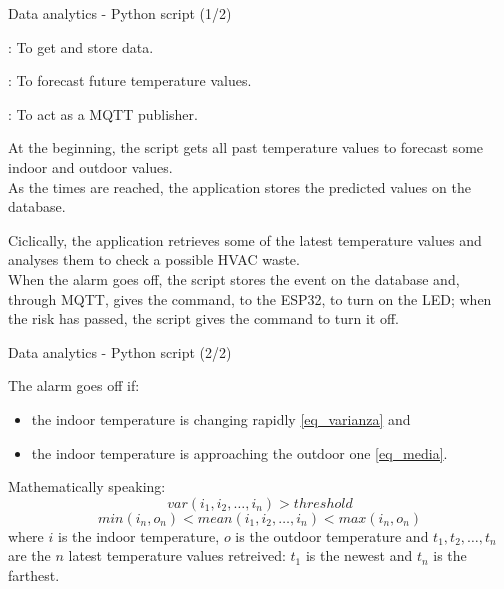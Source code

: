 \documentclass{beamer}
\begin{document}
\begin{frame}{Data analytics -  Python script (1/2)}

	\begin{description}[\texttt{influxdb-client}]		%
		\item[\texttt{influxdb-client}]: To get and store data.
		\item[\texttt{prophet}]: To forecast future temperature values.
		\item[\texttt{paho-mqtt}]: To act as a MQTT publisher.
	\end{description}

	\vfill

	At the beginning, the script gets all past temperature values to forecast some indoor and outdoor values.\\As the times are reached, the application stores the predicted values on the database.
	
	\vfill
	
	Ciclically, the application retrieves some of the latest temperature values and analyses them to check a possible HVAC waste.\\
	When the alarm goes off, the script stores the event on the database and, through MQTT, gives the command, to the ESP32, to turn on the LED; when the risk has passed, the script gives the command to turn it off.

\end{frame}


\begin{frame}{Data analytics -  Python script (2/2)}

	The alarm goes off if:
	\begin{itemize}
		\item the indoor temperature is changing rapidly \eqref{eq_varianza} and
		\item the indoor temperature is approaching the outdoor one \eqref{eq_media}.
	\end{itemize}
	
	\vfill
	
	Mathematically speaking:
	\begin{equation}
	var(i_1, i_2, \dots, i_n) > threshold \label{eq_varianza}
	\end{equation}
	\begin{equation}
	min(i_n, o_n) < mean(i_1, i_2, \dots, i_n) < max(i_n, o_n) \label{eq_media}
	\end{equation}
	where $i$ is the indoor temperature, $o$ is the outdoor temperature and $t_1, t_2, \dots, t_n$ are the $n$ latest temperature values retreived: $t_1$ is the newest and $t_n$ is the farthest.

\end{frame}
\end{document}
